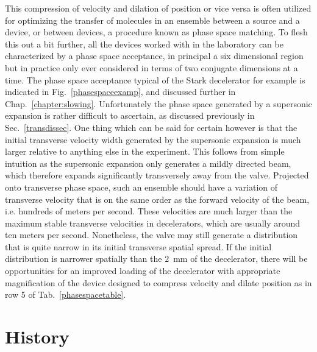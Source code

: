 This compression of velocity and dilation of position or vice versa is often utilized for optimizing the transfer of molecules in an ensemble between a source and a device, or between devices, a procedure known as phase space matching.
To flesh this out a bit further, all the devices worked with in the laboratory can be characterized by a phase space acceptance, in principal a six dimensional region but in practice only ever considered in terms of two conjugate dimensions at a time.
The phase space acceptance typical of the Stark decelerator for example is indicated in Fig.~\ref{phasespaceexamp}, and discussed further in Chap.~\ref{chapter:slowing}.
Unfortunately the phase space generated by a supersonic expansion is rather difficult to ascertain, as discussed previously in Sec.~\ref{transdissec}.
One thing which can be said for certain however is that the initial transverse velocity width generated by the supersonic expansion is much larger relative to anything else in the experiment.
This follows from simple intuition as the supersonic expansion only generates a mildly directed beam, which therefore expands significantly transversely away from the valve.
Projected onto transverse phase space, such an ensemble should have a variation of transverse velocity that is on the same order as the forward velocity of the beam, i.e. hundreds of meters per second. 
These velocities are much larger than the maximum stable transverse velocities in decelerators, which are usually around ten meters per second.
Nonetheless, the valve may still generate a distribution that is quite narrow in its initial transverse spatial spread.
If the initial distribution is narrower spatially than the $2$~mm of the decelerator, there will be opportunities for an improved loading of the decelerator with appropriate magnification of the device designed to compress velocity and dilate position as in row 5 of Tab.~\ref{phasespacetable}.


\section{History}

